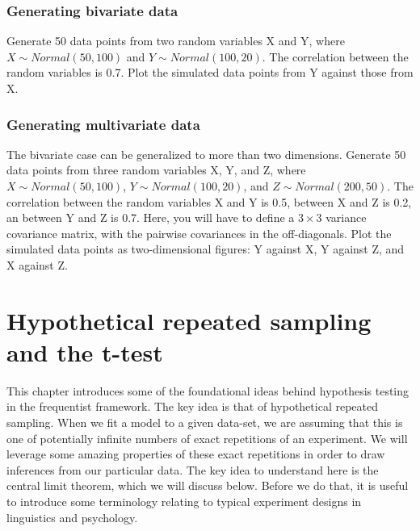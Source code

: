 \documentclass[12pt,]{krantz}
\begin{document}
\hypertarget{sec:Foundationsexercisesbivar}{%
\subsection{Generating bivariate data}\label{sec:Foundationsexercisesbivar}}

Generate 50 data points from two random variables X and Y, where \(X\sim Normal(50,100)\) and \(Y\sim Normal(100,20)\). The correlation between the random variables is 0.7. Plot the simulated data points from Y against those from X.

\hypertarget{sec:Foundationsexercisesmultivar}{%
\subsection{Generating multivariate data}\label{sec:Foundationsexercisesmultivar}}

The bivariate case can be generalized to more than two dimensions.
Generate 50 data points from three random variables X, Y, and Z, where \(X\sim Normal(50,100)\), \(Y\sim Normal(100,20)\), and \(Z\sim Normal(200,50)\). The correlation between the random variables X and Y is 0.5, between X and Z is 0.2, an between Y and Z is 0.7. Here, you will have to define a \(3\times 3\) variance covariance matrix, with the pairwise covariances in the off-diagonals. Plot the simulated data points as two-dimensional figures: Y against X, Y against Z, and X against Z.

\hypertarget{hypothetical-repeated-sampling-and-the-t-test}{%
\chapter{Hypothetical repeated sampling and the t-test}\label{hypothetical-repeated-sampling-and-the-t-test}}

This chapter introduces some of the foundational ideas behind hypothesis testing in the frequentist framework. The key idea is that of hypothetical repeated sampling. When we fit a model to a given data-set, we are assuming that this is one of potentially infinite numbers of exact repetitions of an experiment. We will leverage some amazing properties of these exact repetitions in order to draw inferences from our particular data. The key idea to understand here is the central limit theorem, which we will discuss below. Before we do that, it is useful to introduce some terminology relating to typical experiment designs in linguistics and psychology.
\end{document}
